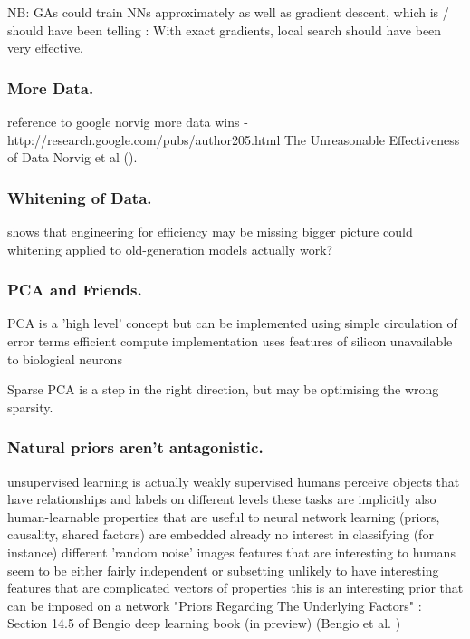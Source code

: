 \documentclass[citeauthoryear]{llncs}
\begin{document}
NB: GAs could train NNs approximately as well as gradient descent, which 
is / should have been telling : With exact gradients, local search should have 
been very effective.


\subsubsection*{More Data.}
  reference to google norvig more data wins - http://research.google.com/pubs/author205.html
    The Unreasonable Effectiveness of Data  Norvig et al (\cite{norvig-UnreasonableEffectivenessOfData}).
    


\subsubsection*{Whitening of Data.}
    shows that engineering for efficiency may be missing bigger picture
    could whitening applied to old-generation models actually work?


\subsubsection*{PCA and Friends.}
PCA is a 'high level' concept
  but can be implemented using simple circulation of error terms
  efficient compute implementation uses features of silicon unavailable to biological neurons

Sparse PCA is a step in the right direction, but may be optimising the wrong sparsity.


\subsubsection*{Natural priors aren't antagonistic.}
unsupervised learning is actually weakly supervised 
  humans perceive objects that have relationships and labels on different levels
    these tasks are implicitly also human-learnable
    properties that are useful to neural network learning (priors, causality, shared factors) are embedded already
  no interest in classifying (for instance) different 'random noise' images
  features that are interesting to humans seem to be either fairly independent or subsetting
    unlikely to have interesting features that are complicated vectors of properties
    this is an interesting prior that can be imposed on a network
      "Priors Regarding The Underlying Factors" : Section 14.5 of Bengio deep learning book (in preview) 
        (Bengio et al. \cite{Bengio-et-al-2014-Book}) 
\end{document}

